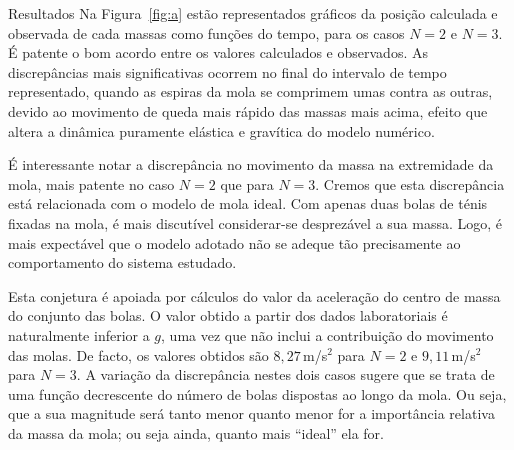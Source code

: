 \documentclass[final]{beamer}
\newlength{\colwidth}
\begin{document}
\begin{frame}[t,fragile]
\begin{columns}[t]
\begin{column}{\colwidth}

\begin{block}{Resultados}
Na Figura~\ref{fig:a}  estão representados gráficos da posição calculada e
observada de cada massas como funções do tempo, para os casos $N=2$ e $N=3$. É
patente o bom acordo entre os valores calculados e observados. As discrepâncias
mais significativas ocorrem no final do intervalo de tempo representado, quando
as espiras da mola se comprimem umas contra as outras, devido ao movimento de
queda mais rápido das massas mais acima, efeito que altera a dinâmica puramente
elástica e gravítica do modelo numérico.

É interessante notar a discrepância no movimento da massa na extremidade
da mola, mais patente no caso $N=2$ que para $N=3$. Cremos que esta discrepância
está relacionada com o modelo de mola ideal. Com apenas duas bolas de ténis
fixadas na mola, é mais discutível considerar-se desprezável a sua massa. Logo,
é mais expectável que o modelo adotado não se adeque tão precisamente ao
comportamento do sistema estudado.

Esta conjetura é apoiada por cálculos do valor da aceleração do centro de massa
do conjunto das bolas. O valor obtido a partir dos dados laboratoriais é
naturalmente inferior a $g$, uma vez que não inclui a contribuição do movimento
das molas. De facto, os valores obtidos são $8,27$\,m/s$^2$ para $N=2$ e
$9,11$\,m/s$^2$ para $N=3$.  A variação da discrepância nestes dois casos
sugere que se trata de uma função decrescente do número de bolas dispostas ao
longo da mola.  Ou seja, que a sua magnitude será tanto menor quanto menor for a
importância relativa da massa da mola; ou seja ainda, quanto mais ``ideal'' ela
for.
	

\end{block}
\end{column}
\end{columns}
\end{frame}
\end{document}
